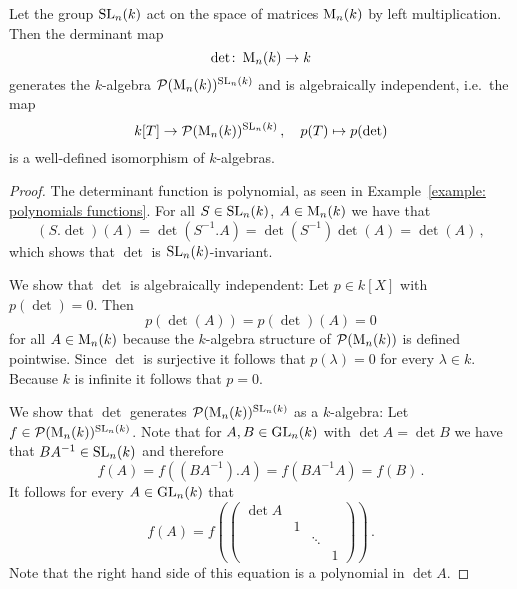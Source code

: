 \begin{theorem}
  Let the group $\operatorname{SL}_n(k)$ act on the space of matrices $\operatorname{M}_n(k)$ by left multiplication.
  Then the derminant map
  \[
            \det
    \colon  \operatorname{M}_n(k)
    \to     k
  \]
  generates the $k$-algebra $\mathcal{P}(\operatorname{M}_n(k))^{\operatorname{SL}_n(k)}$ and is algebraically independent, i.e.\ the map
  \[
            k[T]
    \to     \mathcal{P}(\operatorname{M}_n(k))^{\operatorname{SL}_n(k)} \,,
    \quad   p(T)
    \mapsto p(\det)
  \]
  is a well-defined isomorphism of $k$-algebras.
\end{theorem}
\begin{proof}
  The determinant function is polynomial, as seen in Example~\ref{example: polynomials functions}.
  For all $S \in \operatorname{SL}_n(k)$, $A \in \operatorname{M}_n(k)$ we have that
  \[
      (S.\det)(A)
    = \det\left(S^{-1}.A\right)
    = \det\left( S^{-1} \right) \det(A)
    = \det(A) \,,
  \]
  which shows that $\det$ is $\operatorname{SL}_n(k)$-invariant.
  
  We show that $\det$ is algebraically independent:
  Let $p \in k[X]$ with $p(\det) = 0$.
  Then
  \[
      p(\det(A))
    = p(\det)(A)
    = 0
  \]
  for all $A \in \operatorname{M}_n(k)$ because the $k$-algebra structure of $\mathcal{P}(\operatorname{M}_n(k))$ is defined pointwise.
  Since $\det$ is surjective it follows that $p(\lambda) = 0$ for every $\lambda \in k$.
  Because $k$ is infinite it follows that $p = 0$.
  
  We show that $\det$ generates $\mathcal{P}(\operatorname{M}_n(k))^{\operatorname{SL}_n(k)}$ as a $k$-algebra:
  Let $f \in \mathcal{P}(\operatorname{M}_n(k))^{\operatorname{SL}_n(k)}$.
  Note that for $A, B \in \operatorname{GL}_n(k)$ with $\det A = \det B$ we have that $B A^{-1} \in \operatorname{SL}_n(k)$ and therefore
  \[
      f(A)
    = f\left( (BA^{-1}).A \right)
    = f(B A^{-1} A)
    = f(B) \,.
  \]
  It follows for every $A \in \operatorname{GL}_n(k)$ that
  \begin{equation}
    \label{equation: reduction for GLn}
      f(A)
    = f\left(
        \begin{pmatrix}
          \det A  &   &         &   \\
                  & 1 &         &   \\
                  &   & \ddots  &   \\
                  &   &         & 1
        \end{pmatrix}
      \right) \,.
  \end{equation}
  Note that the right hand side of this equation is a polynomial in $\det A$.
  

\end{proof}
